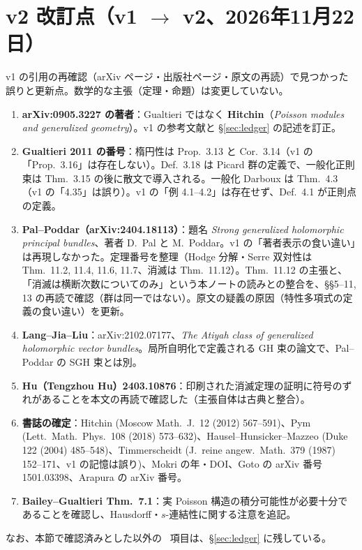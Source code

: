 \section{v2 改訂点（v1 $\to$ v2、2026年11月22日）}\label{sec:rev}
v1 の引用の再確認（arXiv ページ・出版社ページ・原文の再読）で見つかった誤りと更新点。数学的な主張（定理・命題）は変更していない。
\begin{enumerate}
\item \textbf{arXiv:0905.3227 の著者}：Gualtieri ではなく \textbf{Hitchin}（\emph{Poisson modules and generalized geometry}）。v1 の参考文献と \S\ref{sec:ledger} の記述を訂正。
\item \textbf{Gualtieri 2011 の番号}：楕円性は Prop.\ 3.13 と Cor.\ 3.14（v1 の「Prop.\ 3.16」は存在しない）。Def.\ 3.18 は Picard 群の定義で、一般化正則束は Thm.\ 3.15 の後に散文で導入される。一般化 Darboux は Thm.\ 4.3（v1 の「4.35」は誤り）。v1 の「例 4.1--4.2」は存在せず、Def.\ 4.1 が正則点の定義。
\item \textbf{Pal--Poddar（arXiv:2404.18113）}：題名 \emph{Strong generalized holomorphic principal bundles}、著者 D.\ Pal と M.\ Poddar。v1 の「著者表示の食い違い」は再現しなかった。定理番号を整理（Hodge 分解・Serre 双対性は Thm.\ 11.2, 11.4, 11.6, 11.7、消滅は Thm.\ 11.12）。Thm.\ 11.12 の主張と、「消滅は横断次数についてのみ」という本ノートの読みとの整合を、\S\S5--11, 13 の再読で確認（群は同一ではない）。原文の疑義の原因（特性多項式の定義の食い違い）を更新。
\item \textbf{Lang--Jia--Liu}：arXiv:2102.07177、\emph{The Atiyah class of generalized holomorphic vector bundles}。局所自明化で定義される GH 束の論文で、Pal--Poddar の SGH 束とは別。
\item \textbf{Hu（Tengzhou Hu）2403.10876}：印刷された消滅定理の証明に符号のずれがあることを本文の再読で確認した（主張自体は古典と整合）。
\item \textbf{書誌の確定}：Hitchin (Moscow Math.\ J.\ 12 (2012) 567--591)、Pym (Lett.\ Math.\ Phys.\ 108 (2018) 573--632)、Hausel--Hunsicker--Mazzeo (Duke 122 (2004) 485--548)、Timmerscheidt (J.\ reine angew.\ Math.\ 379 (1987) 152--171、v1 の記憶は誤り)、Mokri の年・DOI、Goto の arXiv 番号 1501.03398、Arapura の arXiv 番号。
\item \textbf{Bailey--Gualtieri Thm.\ 7.1}：実 Poisson 構造の積分可能性が必要十分であることを確認し、Hausdorff・$s$-連結性に関する注意を追記。
\end{enumerate}
なお、本節で確認済みとした以外の \tQ\ 項目は、\S\ref{sec:ledger} に残している。
